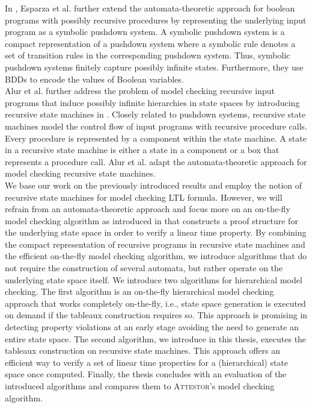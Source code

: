 \documentclass[a4paper, 12pt, twoside]{report}
\begin{document}
	In \cite{schwoon2001}, Esparza et al. further extend the automata-theoretic approach for boolean programs with possibly recursive procedures by representing the underlying input program as a symbolic pushdown system. A symbolic pushdown system is a compact representation of a pushdown system where a symbolic rule denotes a set of transition rules in the corresponding pushdown system. Thus, symbolic pushdown systems finitely capture possibly infinite states. Furthermore, they use BDDs to encode the values of Boolean variables.\\
	
	Alur et al. further address the problem of model checking recursive input programs that induce possibly infinite hierarchies in state spaces by introducing recursive state machines in \cite{alur2001analysis}. Closely related to pushdown systems, recursive state machines model the control flow of input programs with recursive procedure calls. Every procedure is represented by a component within the state machine. A state in a recursive state machine is either a state in a component or a box that represents a procedure call. Alur et al. adapt the automata-theoretic approach for model checking recursive state machines.\\
	
	We base our work on the previously introduced results and employ the notion of recursive state machines for model checking LTL formula. However, we will refrain from an automata-theoretic approach and focus more on an on-the-fly model checking algorithm as introduced in \cite{bhat1995efficient} that constructs a proof structure for the underlying state space in order to verify a linear time property. By combining the compact representation of recursive programs in recursive state machines and the efficient on-the-fly model checking algorithm, we introduce algorithms that do not require the construction of several automata, but rather operate on the underlying state space itself. We introduce two algorithms for hierarchical model checking. The first algorithm is an on-the-fly hierarchical model checking approach that works completely on-the-fly, i.e., state space generation is executed on demand if the tableaux construction requires so. This approach is promising in detecting property violations at an early stage avoiding the need to generate an entire state space. The second algorithm, we introduce in this thesis, executes the tableaux construction on recursive state machines. This approach offers an efficient way to verify a set of linear time properties for a (hierarchical) state space once computed. Finally, the thesis concludes with an evaluation of the introduced algorithms and compares them to \textsc{Attestor}'s model checking algorithm. 
	
\end{document}
